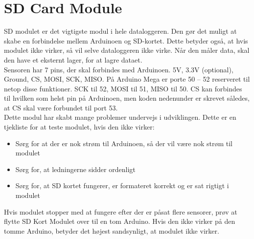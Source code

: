 \section{SD Card Module}
	SD modulet er det vigtigste modul i hele dataloggeren. Den gør det muligt at skabe en forbindelse mellem Arduinoen og SD-kortet. Dette betyder også, at hvis modulet ikke virker, så vil selve dataloggeren ikke virke. Når den måler data, skal den have et eksternt lager, for at lagre dataet. \\ [7pt]
	Sensoren har 7 pins, der skal forbindes med Arduinoen. 5V, 3.3V (optional), Ground, CS, MOSI, SCK, MISO. På Arduino Mega er porte 50 -- 52 reserveret til netop disse funktioner. SCK til 52, MOSI til 51, MISO til 50. CS kan forbindes til hvilken som helst pin på Arduinoen, men koden nedenunder er skrevet således, at CS skal være forbundet til port 53.\\ [7pt]
	Dette modul har skabt mange problemer undervejs i udviklingen. Dette er en tjekliste for at teste modulet, hvis den ikke virker:
	\begin{itemize}
		\item Sørg for at der er nok strøm til Arduinoen, så der vil være nok strøm til modulet
		\item Sørg for, at ledningerne sidder ordenligt
		\item Sørg for, at SD kortet fungerer, er formateret korrekt og er sat rigtigt i modulet
	\end{itemize}
	Hvis modulet stopper med at fungere efter der er påsat flere sensorer, prøv at flytte SD Kort Modulet over til en tom Arduino. Hvis den ikke virker på den tomme Arduino, betyder det højest sandsynligt, at modulet ikke virker.
	 
